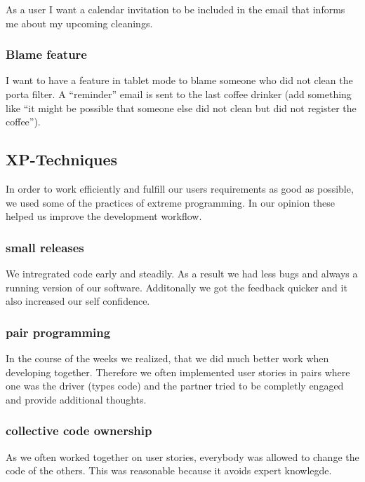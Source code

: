 As a user I want a calendar invitation to be included in the email that
informs me about my upcoming cleanings.

\subsubsection*{Blame feature}

I want to have a feature in tablet mode to blame someone who did not
clean the porta filter. A ``reminder'' email is sent to the last coffee
drinker (add something like ``it might be possible that someone else did
not clean but did not register the coffee'').

\subsection{XP-Techniques}\label{xp-techniques}

In order to work efficiently and fulfill our users requirements as good
as possible, we used some of the practices of extreme programming. In
our opinion these helped us improve the development workflow.

\subsubsection{small releases}\label{small-releases}

We intregrated code early and steadily. As a result we had less bugs and
always a running version of our software. Additonally we got the
feedback quicker and it also increased our self confidence.

\subsubsection{pair programming}\label{pair-programming}

In the course of the weeks we realized, that we did much better work
when developing together. Therefore we often implemented user stories in
pairs where one was the driver (types code) and the partner tried to be
completly engaged and provide additional thoughts.

\subsubsection{collective code
ownership}\label{collective-code-ownership}

As we often worked together on user stories, everybody was allowed to
change the code of the others. This was reasonable because it avoids
expert knowlegde.

